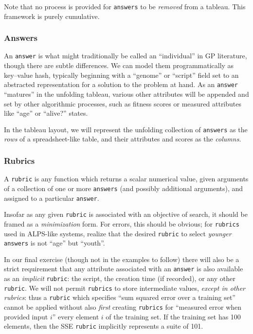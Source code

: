 Note that no process is provided for {\tt answers} to be \emph{removed} from a tableau. This framework is purely cumulative.

\subsubsection{Answers}\hypertarget{answers}{}\label{answers}

An {\tt answer} is what might traditionally be called an ``individual'' in GP literature, though there are subtle differences. We can model them programmatically as key--value hash, typically beginning with a ``genome'' or ``script'' field set to an abstracted representation for a solution to the problem at hand. As an {\tt answer} ``matures'' in the unfolding tableau, various  other attributes will be appended and set by other algorithmic processes, such as fitness scores or measured attributes like ``age'' or ``alive?'' states.

In the tableau layout, we will represent the unfolding collection of {\tt answers} as the \emph{rows} of a spreadsheet-like table, and their attributes and scores as the \emph{columns}.

\subsubsection{Rubrics}\hypertarget{rubrics}{}\label{rubrics}

A {\tt rubric} is any function which returns a scalar numerical value, given arguments of a collection of one or more {\tt answers} (and possibly additional arguments), and assigned to a particular {\tt answer}.

Insofar as any given {\tt rubric} is associated with an objective of search, it should be framed as a \emph{minimization} form. For errors, this should be obvious; for {\tt rubrics} used in ALPS-like systems, realize that the desired {\tt rubric} to select \emph{younger} {\tt answers} is not ``age'' but ``youth''.

In our final exercise (though not in the examples to follow) there will also be a strict requirement that any attribute associated with an {\tt answer} is also available as an \emph{implicit} {\tt rubric}: the script, the creation time (if recorded), or any other {\tt rubric}. We will not permit {\tt rubrics} to store intermediate values, \emph{except in other rubrics}: thus a {\tt rubric} which specifies ``sum squared error over a training set'' cannot be applied without also \emph{first} creating {\tt rubrics} for ``measured error when provided input $i$'' every element $i$ of the training set. If the training set has 100 elements, then the SSE {\tt rubric} implicitly represents a suite of 101.

